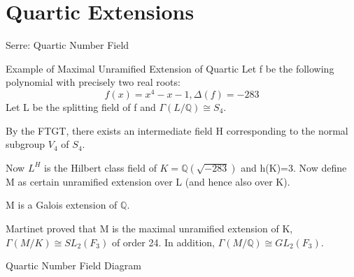 \documentclass[10pt]{beamer}
\theoremstyle{plain} %
\begin{document}
\section{Quartic Extensions}
\begin{frame}{Serre: Quartic Number Field}
\begin{block}{Example of Maximal Unramified Extension of Quartic }
Let f be the following polynomial with precisely two real roots: \begin{equation}
    f(x)=x^4-x-1, \Delta(f)=-283
\end{equation}
Let  L be the splitting field of f and $\Gamma(L/\mathbb{Q})\cong S_4$.\par
By the FTGT, there exists an intermediate field H corresponding to the normal subgroup $V_4$ of $S_4$. \par 
Now $L^H$ is the Hilbert class field of $K= \mathbb{Q}(\sqrt{-283})$ and h(K)=3. Now define M as certain unramified extension over L (and hence also over K).
\par M is a Galois extension of $\mathbb{Q}$.  
\par Martinet proved that M is the maximal unramified extension of K, $\Gamma(M/K)\cong SL_2(F_3)$ of order 24. In addition, $\Gamma(M/\mathbb{Q})\cong GL_2(F_3)$. 
\end{block}
\end{frame}
\begin{frame}{Quartic Number Field Diagram}
  \begin{center}
\end{center}  
\end{frame}
\end{document}
